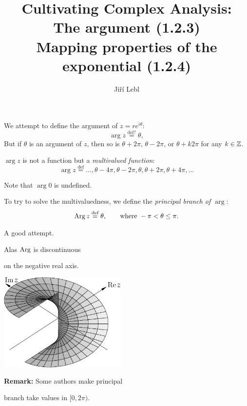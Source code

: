 \documentclass[10pt,aspectratio=169]{beamer}
\author{Ji\v{r}\'i Lebl}
\institute[OSU]{%
Departemento pri Matematiko de Oklahoma {\^S}tata Universitato}
\title{Cultivating Complex Analysis:\\%
The argument (1.2.3)\\%
Mapping properties of the exponential (1.2.4)}
\date{}
\begin{document}
\begin{frame}
\titlepage
\end{frame}

\begin{frame}
We attempt to define the argument of $z = re^{i\theta}$:
\begin{equation*}
\arg z
\overset{\text{def?}}{=}
\theta ,
\end{equation*}
\pause
But if $\theta$ is an argument of $z$,
then so is $\theta+2\pi$, $\theta-2\pi$, or $\theta + k 2\pi$ for any $k \in
{\mathbb{Z}}$.

\medskip
\pause

$\arg z$ is not a function but a \emph{multivalued function}:
\begin{equation*}
\arg z
\overset{\text{def}}{=}
\ldots,\theta - 4\pi,
\theta - 2\pi,
\theta ,
\theta + 2\pi,
\theta + 4\pi, \ldots
\end{equation*}

\pause

Note that $\arg 0$ is undefined.

\end{frame}

\begin{frame}
To try to solve the multivaluedness, we define the
\emph{principal branch of $\arg$}:
\begin{equation*}
\operatorname{Arg} z
\overset{\text{def}}{=}
\theta, \qquad \text{where } -\pi < \theta \leq \pi.
\end{equation*}

\pause

A good attempt.

\medskip

Alas $\operatorname{Arg}$ is discontinuous

on the negative real axis.


\vspace*{-0.5in}
\hspace*{2.7in}%
\includegraphics[width=2.5in]{../figures/arggraph}

\pause

\vspace*{-0.8in}

\textbf{Remark:} Some authors make principal

branch take values in $[0,2\pi)$.

\end{frame}
\end{document}
